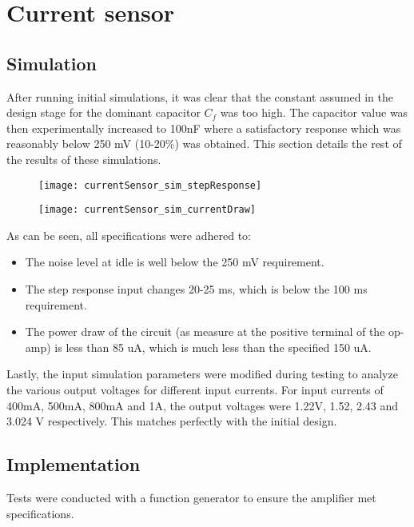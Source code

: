 \graphicspath{{content/3_results/figures}}
\section{Current sensor}\label{sec:current_sensor_results}

\subsection{Simulation}

After running initial simulations, it was clear that the constant assumed in the design stage for the dominant capacitor $C_f$ was too high. The capacitor value was then experimentally
increased to 100nF where a satisfactory response which was reasonably below 250 mV (10-20\%) was obtained. This section details the rest of the results of these simulations.

\begin{figure}[h!]
   \centering
   \texttt{[image: currentSensor\_sim\_stepResponse]}
   \label{fig:simulation response}
\end{figure}

\begin{figure}[h!]
   \centering
   \texttt{[image: currentSensor\_sim\_currentDraw]}
   \label{fig:simulation_current}
\end{figure}

As can be seen, all specifications were adhered to:
\begin{itemize}
   \item The noise level at idle is well below the 250 mV requirement.
   \item The step response input changes 20-25 ms, which is below the 100 ms requirement.
   \item The power draw of the circuit (as measure at the positive terminal of the op-amp) is less than 85 uA, which is much less than the specified 150 uA.
\end{itemize}

Lastly, the input simulation parameters were modified during testing to analyze the various output voltages for different input currents. For input currents of 400mA, 500mA, 800mA and 1A,
the output voltages were 1.22V, 1.52, 2.43 and 3.024 V respectively. This matches perfectly with the initial design.

\subsection{Implementation}
Tests were conducted with a function generator to ensure the amplifier met specifications.

